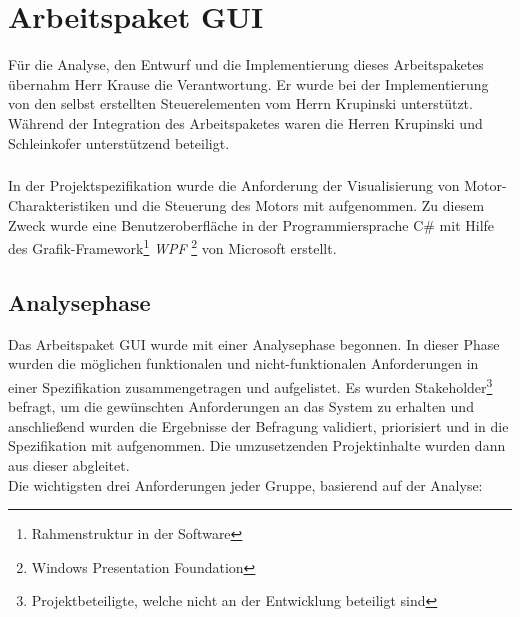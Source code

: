 \graphicspath{{./gui/Bilder/}}

\chapter{Arbeitspaket GUI}
\label{GUI}
Für die Analyse, den Entwurf und die Implementierung dieses Arbeitspaketes übernahm Herr Krause die Verantwortung. Er wurde bei der Implementierung von den selbst erstellten Steuerelementen vom Herrn Krupinski unterstützt. Während der Integration des Arbeitspaketes waren die Herren Krupinski und Schleinkofer unterstützend beteiligt.
\paragraph{}
In der Projektspezifikation wurde die Anforderung der Visualisierung von Motor-Charakteristiken und die Steuerung des Motors mit aufgenommen. Zu diesem Zweck wurde eine Benutzeroberfläche in der Programmiersprache C\# mit Hilfe des Grafik-Framework\footnote{Rahmenstruktur in der Software} \textit{WPF} \footnote{Windows Presentation Foundation} von Microsoft erstellt.

\section{Analysephase}
Das Arbeitspaket GUI wurde mit einer Analysephase begonnen. In dieser Phase wurden die möglichen funktionalen und nicht-funktionalen Anforderungen in einer Spezifikation zusammengetragen und aufgelistet. Es wurden Stakeholder\footnote{Projektbeteiligte, welche nicht an der Entwicklung beteiligt sind} befragt, um die gewünschten Anforderungen an das System zu erhalten und anschließend wurden die Ergebnisse der Befragung validiert, priorisiert und in die Spezifikation mit aufgenommen. Die umzusetzenden Projektinhalte wurden dann aus dieser abgleitet.\\
Die wichtigsten drei Anforderungen jeder Gruppe, basierend auf der Analyse: \\

